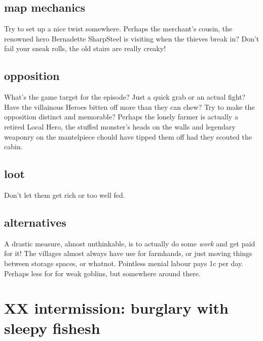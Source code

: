 \subsection*{map mechanics}

Try to set up a nice twist somewhere. Perhaps the merchant's cousin, the renowned hero Bernadette SharpSteel is visiting when the thieves break in? Don't fail your sneak rolls, the old stairs are really creaky!


\subsection*{opposition}

What's the game target for the episode? Just a quick grab or an actual fight? Have the villainous Heroes bitten off more than they can chew? Try to make the opposition distinct and memorable? Perhaps the lonely farmer is actually a retired Local Hero, the stuffed monster's heads on the walls and legendary weaponry on the mantelpiece chould have tipped them off had they scouted the cabin.


\subsection*{loot}

Don't let them get rich or too well fed.


\subsection*{alternatives}
A drastic measure, almost unthinkable, is to actually do some \emph{work} and get paid for it! The villages almost always have use for farmhands, or just moving things between storage spaces, or whatnot. Pointless menial labour pays 1c per day. Perhaps less for for weak goblins, but somewhere around there.









\clearpage
\section*{XX intermission: burglary with sleepy fishesh}

